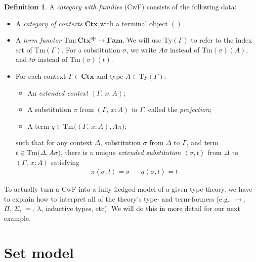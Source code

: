 \documentclass{article}
\theoremstyle{definition}
\newtheorem{definition}{Definition}[section]
\newcommand{\emp}{()}%
\newcommand{\comp}[2]{#2#1}%
\newcommand{\substType}[2]{#2#1}%
\newcommand{\substTerm}[2]{#2#1}%
\newcommand{\extsub}[2]{\ang{#1,#2}}
\newcommand{\C}{\mathbf{Ctx}}
\newcommand{\Fam}{\mathbf{Fam}}
\newcommand{\Ty}{\mathrm{Ty}}
\newcommand{\Tm}{\mathrm{Tm}}
\newcommand{\op}[1]{{#1}^\mathrm{op}}           %
\newcommand{\ang}[1]{\mathopen{}\left\langle #1 \right\rangle\mathclose{}}
\begin{document}
\begin{definition}\label{defn:cwf}
    A \textit{category with families} (CwF) consists of the following data:
    \begin{itemize}
        \item A \textit{category of contexts} $\C$ with a terminal object $\emp$. %
        
        \item A \textit{term functor} $\Tm\colon \op{\C} \to \Fam$. We will use $\Ty(\Gamma)$ to refer to the index set of $\Tm(\Gamma)$. For a substitution $\sigma$, we write $\substType{\sigma}{A}$ instead of $\Tm(\sigma)(A)$, and $\substType{\sigma}{t}$ instead of $\Tm(\sigma)(t)$.
        
        \item For each context $\Gamma \in \C$ and type $A \in \Ty(\Gamma)$:
        \begin{itemize}
            \item An \textit{extended context} $(\Gamma,\, x : A)$;
            
            \item A substitution $\pi$ from $(\Gamma,\, x : A)$ to $\Gamma$, called the \textit{projection};
            
            \item A term $q \in \Tm \big( (\Gamma,\, x : A), \substType{\pi}{A} \big)$;
        \end{itemize}
        such that for any context $\Delta$, substitution $\sigma$ from $\Delta$ to $\Gamma$, and term $t \in \Tm \big( \Delta, \substType{\sigma}{A} \big)$, there is a unique \textit{extended substitution} $\extsub{\sigma}{t}$ from $\Delta$ to $(\Gamma,\, x : A)$ satisfying
        \begin{align*}
            \comp{\extsub{\sigma}{t}}{\pi} = \sigma & & \substTerm{\extsub{\sigma}{t}}{q} = t
        \end{align*}
    \end{itemize}
\end{definition}

To actually turn a CwF into a fully fledged model of a given type theory, we have to explain how to interpret all of the theory's type- and term-formers (e.g.\ $\to$, $\Pi$, $\Sigma$, $=$, $\lambda$, inductive types, etc). We will do this in more detail for our next example.


\section{Set model}
\label{sec:set}
\end{document}
